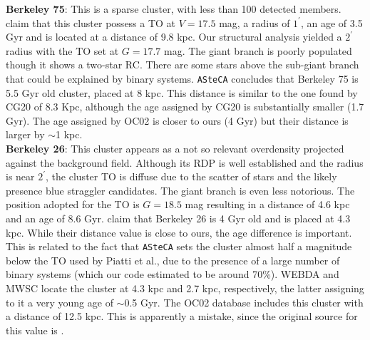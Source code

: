 \documentclass[draft]{aa}
\begin{document}
\begin{appendix}
  \noindent \textbf{Berkeley 75}: This is a sparse cluster, with less than 100
  detected members. \cite{Carraro_2005} claim that this cluster possess
  a TO at $V= 17.5$ mag, a radius of $1^{\prime}$, an age of 3.5 Gyr and is
  located at a distance of 9.8 kpc.
  Our structural analysis yielded a $2^{\prime}$ radius with the TO set at
  $G=17.7$ mag. The giant branch is poorly populated though it shows a two-star
  RC. There are some stars above the sub-giant branch that could be explained
  by binary systems. \texttt{ASteCA} concludes that Berkeley 75 is 5.5 Gyr old
  cluster, placed at 8 kpc. This distance is similar to the one found by CG20
  of 8.3 Kpc, although the age assigned by CG20 is substantially smaller (1.7
  Gyr). The age assigned by OC02 is closer to ours (4 Gyr) but their distance is
  larger by $\sim$1 kpc.\\

  \noindent \textbf{Berkeley 26}: This cluster appears as a not so relevant overdensity
  projected against the background field. Although its RDP is well established
  and the radius is near $2^{\prime}$, the cluster TO is diffuse due to the
  scatter of stars and the likely presence blue straggler candidates. The
  giant branch is even less notorious.
  The position adopted for the TO is $G=18.5$ mag resulting in a distance of 4.6
  kpc and an age of 8.6 Gyr. \cite{Piatti_2010} claim that Berkeley 26 is 4 Gyr
  old and is placed at 4.3 kpc. While their distance value is close to ours, the
  age difference is important. This is related to the fact that \texttt{ASteCA}
  sets the cluster almost half a magnitude below the TO used by Piatti et al.,
  due to the presence of a large number of binary systems (which our code
  estimated to be around 70\%).
  WEBDA and MWSC locate the cluster at 4.3 kpc and 2.7 kpc, respectively, the
  latter assigning to it a very young age of $\sim$0.5 Gyr. The OC02 database
  includes this cluster with a distance of 12.5 kpc. This is apparently
  a mistake, since the original source for this value is \cite{Piatti_2010}.\\


\end{appendix}
\end{document}

